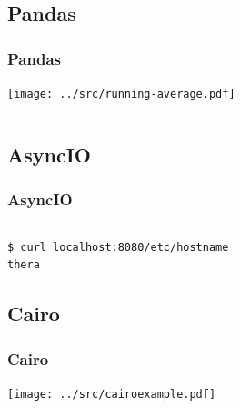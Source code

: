 %    

\subsection{Pandas}
\begin{frame}
    \frametitle{Pandas}
    \vspace{3mm}
    \hspace{105mm}\texttt{[image: ../src/running-average.pdf]}
    \vspace{-73mm}\inputminted[fontsize=\footnotesize]{python}{../src/pandas-example.py}
\end{frame}

\subsection{AsyncIO}
\begin{frame}[fragile]
    \frametitle{AsyncIO}
    \vspace{-2mm}
    \inputminted[fontsize=\tiny]{python3}{../src/webserver.py}
    \pause
    \vspace{2mm}
    {\tiny
    \begin{verbatim}
$ curl localhost:8080/etc/hostname
thera
    \end{verbatim}
    }
\end{frame}

\subsection{Cairo}
\begin{frame}
    \frametitle{Cairo}
    \vspace{10mm}
    \hspace{105mm}\texttt{[image: ../src/cairoexample.pdf]}
    \vspace{-75mm}\inputminted[fontsize=\footnotesize]{python}{../src/cairoexample.py}
\end{frame}

